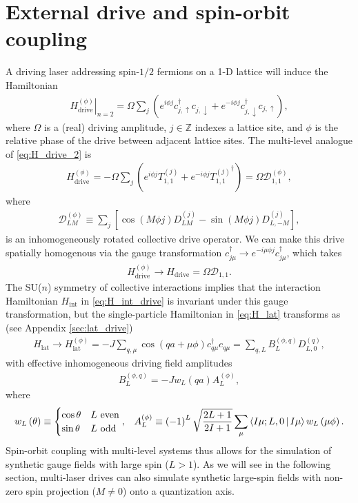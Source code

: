 \documentclass[nofootinbib,notitlepage,11pt]{revtex4-2}
\renewcommand{\t}{\text} %
\newcommand{\f}[2]{\dfrac{#1}{#2}} %
\newcommand{\p}[1]{\left(#1\right)} %
\renewcommand{\sp}[1]{\left[#1\right]} %
\newcommand{\bk}{\Braket} %
\newcommand{\1}{\mathds{1}}
\newcommand{\up}{\uparrow}
\newcommand{\dn}{\downarrow}
\newcommand{\D}{\mathcal{D}}
\begin{document}
\section{External drive and spin-orbit coupling}
\label{sec:drive_SOC}

A driving laser addressing spin-$1/2$ fermions on a 1-D lattice will
induce the Hamiltonian
\begin{align}
  \left. H_{\t{drive}}^{(\phi)} \right|_{n=2}
  = \Omega \sum_j
  \p{e^{i\phi j} c_{j,\up}^\dag c_{j,\dn}
    + e^{-i\phi j} c_{j,\dn}^\dag c_{j,\up}},
  \label{eq:H_drive_2}
\end{align}
where $\Omega$ is a (real) driving amplitude, $j\in\mathbb{Z}$ indexes
a lattice site, and $\phi$ is the relative phase of the drive between
adjacent lattice sites.  The multi-level analogue of
\eqref{eq:H_drive_2} is
\begin{align}
  H_{\t{drive}}^{(\phi)}
  = -\Omega \sum_j \p{e^{i\phi j} T_{1,1}^{(j)}
    + e^{-i\phi j} {T_{1,1}^{(j)}}^\dag}
  = \Omega \D_{1,1}^{(\phi)},
  \label{eq:H_drive}
\end{align}
where
\begin{align}
  \D_{LM}^{(\phi)}
  \equiv \sum_j \sp{\cos\p{M\phi j} D_{LM}^{(j)}
    - \sin\p{M\phi j} D_{L,-M}^{(j)}},
  \label{eq:drive_rot}
\end{align}
is an inhomogeneously rotated collective drive operator.  We can make
this drive spatially homogenous via the gauge transformation
$c_{j\mu}^\dag \to e^{-i\mu\phi j} c_{j\mu}^\dag$, which takes
\begin{align}
  H_{\t{drive}}^{(\phi)} \to H_{\t{drive}} = \Omega \D_{1,1}.
\end{align}
The SU($n$) symmetry of collective interactions implies that the
interaction Hamiltonian $H_{\t{int}}$ in \eqref{eq:H_int_drive} is
invariant under this gauge transformation, but the single-particle
Hamiltonian in \eqref{eq:H_lat} transforms as (see Appendix
\ref{sec:lat_drive})
\begin{align}
  H_{\t{lat}}
  \to H_{\t{lat}}^{(\phi)}
  = -J \sum_{q,\mu} \cos\p{qa+\mu\phi} c_{q\mu}^\dag c_{q\mu}
  = \sum_{q,L} B_L^{(\phi,q)} D_{L,0}^{(q)},
  \label{eq:H_lat_SOC}
\end{align}
with effective inhomogeneous driving field amplitudes
\begin{align}
  B_L^{(\phi,q)} = -J w_L\p{qa} A_L^{(\phi)},
\end{align}
where
\begin{align}
  w_L\p{\theta} \equiv
  \begin{cases}
    \cos\theta & L~\t{even} \\
    \sin\theta & L~\t{odd}
  \end{cases},
  &&
  A_L^{(\phi)} \equiv \p{-1}^L \sqrt{\f{2L+1}{2I+1}}
  \sum_\mu \bk{I\mu;L,0|I\mu} w_L\p{\mu\phi}.
\end{align}
Spin-orbit coupling with multi-level systems thus allows for the
simulation of synthetic gauge fields with large spin ($L>1$).  As we
will see in the following section, multi-laser drives can also
simulate synthetic large-spin fields with non-zero spin projection
($M\ne0$) onto a quantization axis.
\end{document}
